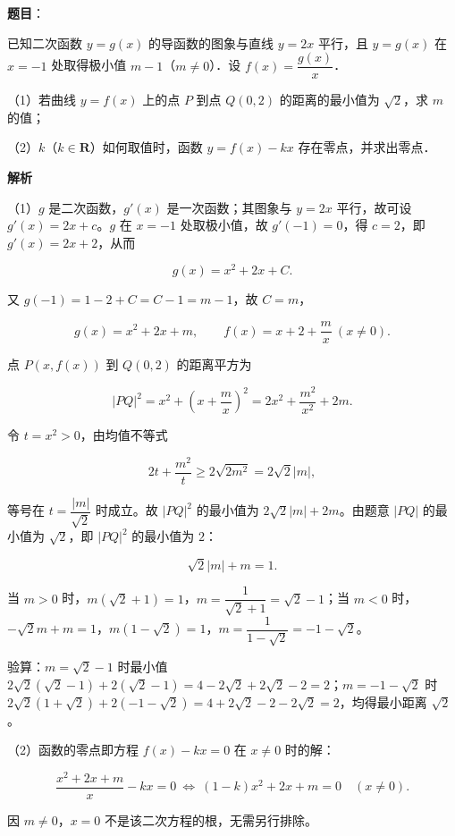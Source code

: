 \begin{answer}

\textbf{题目}：

已知二次函数 $y=g(x)$ 的导函数的图象与直线 $y=2x$ 平行，且 $y=g(x)$ 在 $x=-1$ 处取得极小值 $m-1$（$m\neq0$）．设 $f(x)=\dfrac{g(x)}{x}$．

（1）若曲线 $y=f(x)$ 上的点 $P$ 到点 $Q(0,2)$ 的距离的最小值为 $\sqrt2$，求 $m$ 的值；

（2）$k$（$k\in\mathbf R$）如何取值时，函数 $y=f(x)-kx$ 存在零点，并求出零点．

\textbf{解析}

（1）$g$ 是二次函数，$g'(x)$ 是一次函数；其图象与 $y=2x$ 平行，故可设 $g'(x)=2x+c$。$g$ 在 $x=-1$ 处取极小值，故 $g'(-1)=0$，得 $c=2$，即 $g'(x)=2x+2$，从而

\nopagebreak[4]
\[g(x)=x^2+2x+C.\]

又 $g(-1)=1-2+C=C-1=m-1$，故 $C=m$，

\nopagebreak[4]
\[g(x)=x^2+2x+m,\qquad f(x)=x+2+\frac mx\ (x\neq0).\]

点 $P(x,f(x))$ 到 $Q(0,2)$ 的距离平方为

\nopagebreak[4]
\[|PQ|^2=x^2+\left(x+\frac mx\right)^2=2x^2+\frac{m^2}{x^2}+2m.\]

令 $t=x^2>0$，由均值不等式

\nopagebreak[4]
\[2t+\frac{m^2}{t}\geqslant2\sqrt{2m^2}=2\sqrt2|m|,\]

等号在 $t=\dfrac{|m|}{\sqrt2}$ 时成立。故 $|PQ|^2$ 的最小值为 $2\sqrt2|m|+2m$。由题意 $|PQ|$ 的最小值为 $\sqrt2$，即 $|PQ|^2$ 的最小值为 $2$：

\nopagebreak[4]
\[\sqrt2|m|+m=1.\]

当 $m>0$ 时，$m(\sqrt2+1)=1$，$m=\dfrac1{\sqrt2+1}=\sqrt2-1$；当 $m<0$ 时，$-\sqrt2m+m=1$，$m(1-\sqrt2)=1$，$m=\dfrac1{1-\sqrt2}=-1-\sqrt2$。

验算：$m=\sqrt2-1$ 时最小值 $2\sqrt2(\sqrt2-1)+2(\sqrt2-1)=4-2\sqrt2+2\sqrt2-2=2$；$m=-1-\sqrt2$ 时 $2\sqrt2(1+\sqrt2)+2(-1-\sqrt2)=4+2\sqrt2-2-2\sqrt2=2$，均得最小距离 $\sqrt2$。

（2）函数的零点即方程 $f(x)-kx=0$ 在 $x\neq0$ 时的解：

\nopagebreak[4]
\[\frac{x^2+2x+m}{x}-kx=0\ \Longleftrightarrow\ (1-k)x^2+2x+m=0\quad(x\neq0).\]

因 $m\neq0$，$x=0$ 不是该二次方程的根，无需另行排除。


\end{answer}
